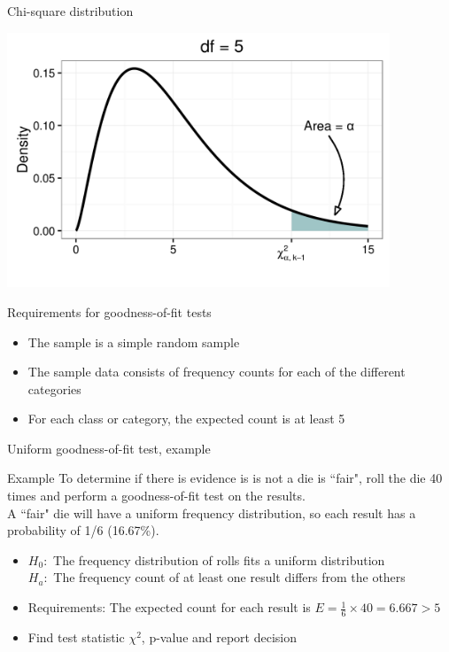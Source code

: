 \documentclass[xcolor=table, aspectratio=169, bigger]{beamer}
\begin{document}
\begin{frame}{Chi-square distribution}
\bigskip
{\centering
\includegraphics[width=4.5in]{../images/ch11_chi_square_crit}
\par}
\end{frame}



\begin{frame}{Requirements for goodness-of-fit tests}
\begin{block}{}
\begin{itemize}
\item The sample is a simple random sample
\pause\item The sample data consists of frequency counts for each of the different categories
\pause\item For each class or category, the expected count is at least 5 
\end{itemize}
\end{block}
\end{frame}


\begin{frame}{Uniform goodness-of-fit test, example}
\begin{exampleblock}{Example}
To determine if there is evidence is is not a die is ``fair", roll the die 40 times and perform a goodness-of-fit test on the results. \\
\medskip
A ``fair" die will have a uniform frequency distribution, so each result has a probability of 1/6 (16.67\%).
\medskip
\begin{itemize}
\pause\item $H_0:$ The frequency distribution of rolls fits a uniform distribution\\
$H_a:$ The frequency count of at least one result differs from the others

\pause\item Requirements: The expected count for each result is $E = \frac 1 6 \times 40 = 6.667 > 5$
\pause\item Find test statistic $\chi^2$, p-value and report decision
\end{itemize}
\end{exampleblock}
\end{frame}
\end{document}
